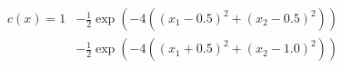 \documentclass[12pt]{article}
\begin{document}
\begin{align*}
  c(x) = 1 &- \frac{1}{2}  \exp\left( -4 ((x_1 - 0.5)^2 + (x_2 - 0.5)^2)\right) \\
  &- \frac{1}{2}  \exp\left( -4 ((x_1 + 0.5)^2 + (x_2 - 1.0)^2)\right)
\end{align*}
\end{document}

